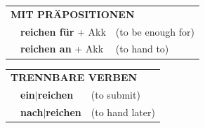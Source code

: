 \documentclass[10pt,a4paper]{revtex4-2}
\begin{document}
\begin{verbbox}
\vspace{10pt}

\begin{tabular}{lll}
\multicolumn{3}{l}{\textbf{MIT PRÄPOSITIONEN}}\\
& \textbf{reichen für} + Akk & (to be enough for)\\
& \textbf{reichen an} + Akk & (to hand to)\\
\end{tabular}
\hfill
\begin{tabular}{lll}
\multicolumn{3}{l}{\textbf{TRENNBARE VERBEN}}\\
& \textbf{ein$|$reichen} & (to submit)\\
& \textbf{nach$|$reichen} & (to hand later)\\
\end{tabular}

\vspace{-5pt}
\end{verbbox}
\end{document}
